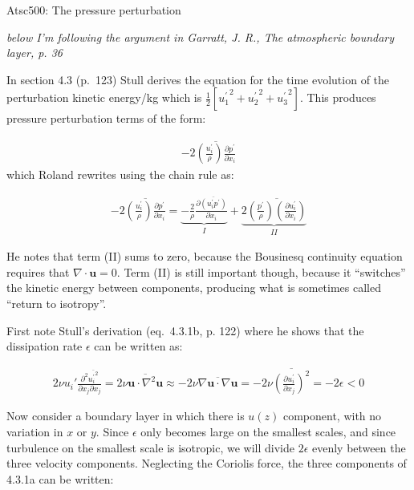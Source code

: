 \documentclass[12pt]{article}
\newcommand{\vect}[1]{\mathbf{{#1}}}
\begin{document}
\pagestyle{first}

\begin{center}
Atsc500: The pressure perturbation\\
\end{center}


\textit{below I'm following the argument in Garratt, J. R., The atmospheric boundary layer, p. 36}

In section 4.3 (p.~123) Stull derives the equation for the time evolution of 
the perturbation kinetic energy/kg  which is
 $\frac{1 }{2} \left [ {u_1^\prime}^2 + {u_2^\prime}^2 + {u_3^\prime}^2 \right ]$.  This produces 
pressure perturbation terms of the form:

\begin{gather}
  -2 \overline{  \left (  \frac{ {u_i^\prime}  }{ \rho}   \right )  \frac{\partial p^\prime  }{\partial x_i} }
\end{gather}
which Roland rewrites using the chain rule as:

\begin{gather}
    -2 \overline{  \left (  \frac{ {u_i^\prime}  }{ \rho}   \right )  \frac{\partial p^\prime  }{\partial x_i} }
=  \underbrace{  - \frac{2 }{\rho} \frac{\partial \overline{  (u_i^\prime p^\prime )}  }{\partial x_i }  }_I
+ \underbrace{
2 \overline{ \left (  \frac{p^\prime  }{\rho}  \right ) \left (  \frac{\partial   u_i^\prime }  {\partial x_i }  \right ) }}_{II}
\end{gather}

He notes that term (II) sums to zero, because the Bousinesq continuity
equation requires that $\nabla \cdot \vect{u} =0$.  Term (II) is still
important though, because it ``switches'' the kinetic energy between
components, producing what is sometimes called ``return to isotropy''.

First note Stull's derivation (eq.~4.3.1b, p. 122) where he shows that the dissipation rate $\epsilon$ 
can be written as: 

\begin{gather}
 2 \nu u_i\prime \frac{\partial^2 \overline{ {u_i^\prime}^2 } }{\partial x_j \partial x_j}     = 
2 \nu \overline{ \vect{u} \cdot \nabla^2 \vect{u}    }  \approx
- 2 \nu \overline{ \nabla \vect{u} \cdot \nabla \vect{u}    }
 = - 2 \nu \overline{ \left (  \frac{\partial u^\prime_i }{\partial x_j}  \right )^2 } = - 2 \epsilon < 0
\end{gather}

Now consider a boundary layer in which there is  $u(z)$ component, with no variation in $x$ or $y$.  
Since $\epsilon$ only
becomes large on the smallest scales, and since turbulence on the smallest scale is isotropic,
we will divide $2 \epsilon$ evenly between the three velocity components.  Neglecting the 
Coriolis force, the three components of 4.3.1a can be written:
\end{document}
